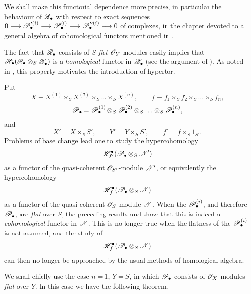 \begin{remarks}[6.10.3]
We shall make this functorial dependence more precise, in
particular the behaviour of $\mathscr{R}_\bullet$ with respect to
exact sequences $0\longrightarrow\mathscr{P}_\bullet^{\prime(i)}
\longrightarrow\mathscr{P}_\bullet^{(i)}
\longrightarrow\mathscr{P}_\bullet^{\prime\prime(i)}
\longrightarrow0$ of complexes,
in the chapter devoted to a general algebra of cohomological
functors mentioned in .
\end{remarks}

\begin{scholium}[6.10.4]
\label{III.6.10.4}
The fact that $\mathscr{R}_\bullet$ consists of $S$-\emph{flat}
$\mathscr{O}_Y$-modules easily implies that $\mathscr{H}_\bullet
(\mathscr{R}_\bullet\otimes_S\mathscr{Q}_\bullet')$
is a \emph{homological} functor in $\mathscr{Q}_\bullet'$ (see the
argument of ).  As noted in
, this property motivates the introduction of
hypertor.

Put
\[
  X=X^{(1)}\times_SX^{(2)}\times_S\ldots\times_SX^{(n)},
  \qquad
  f=f_1\times_Sf_2\times_S\ldots\times_Sf_n,
\]
\[
  \mathscr{P}_\bullet
  =
  \mathscr{P}_\bullet^{(1)}
  \otimes_S\mathscr{P}_\bullet^{(2)}
  \otimes_S\ldots\otimes_S\mathscr{P}_\bullet^{(n)},
\]
and
\[
  X'=X\times_SS',
  \qquad
  Y'=Y\times_SS',
  \qquad
  f'=f\times_S1_{S'}.
\]
Problems of base change lead one to study the hypercohomology
\[
  \mathscr{H}^\bullet_{f'}
  (\mathscr{P}_\bullet\otimes_S\mathscr{N}')
\]
as a functor of the quasi-coherent $\mathscr{O}_{S'}$-module
$\mathscr{N}'$, or equivalently the hypercohomology
\[
  \mathscr{H}^\bullet_f
  (\mathscr{P}_\bullet\otimes_S\mathscr{N})
\]
as a functor of the quasi-coherent $\mathscr{O}_S$-module $\mathscr{N}$.
When the $\mathscr{P}_\bullet^{(i)}$, and therefore
$\mathscr{P}_\bullet$, are \emph{flat} over $S$, the preceding results and
 show that this is indeed a \emph{cohomological}
functor in $\mathscr{N}$.  This is no longer true when the flatness
of the $\mathscr{P}_\bullet^{(i)}$ is not assumed, and the study of
\[
  \mathscr{H}^\bullet_f(\mathscr{P}_\bullet\otimes_S\mathscr{N})
\]
can then no longer be approached by the usual methods of
homological algebra.

We shall chiefly use the case $n=1$, $Y=S$, in which
$\mathscr{P}_\bullet$ consists of $\mathscr{O}_X$-modules \emph{flat} over $Y$.
In this case we have the following theorem.
\end{scholium}

